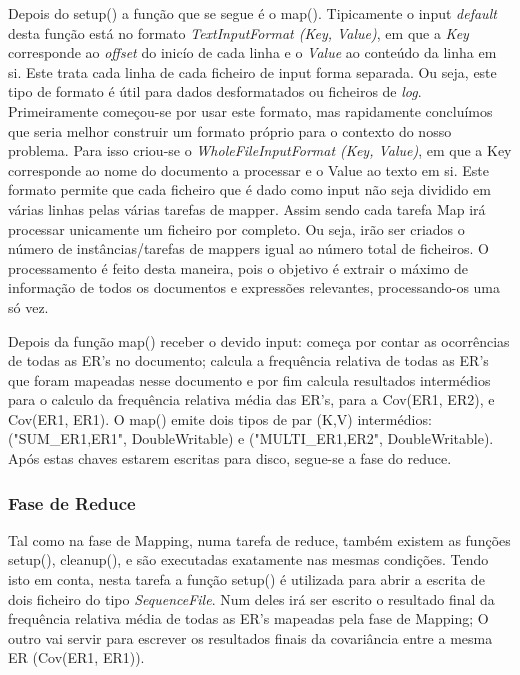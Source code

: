 Depois do setup() a função que se segue é o map(). Tipicamente o input \textit{default} desta função está no formato \textit{TextInputFormat (Key, Value)}, em que a \textit{Key} corresponde ao \textit{offset} do inicío de cada linha e o \textit{Value} ao conteúdo da linha em si. Este trata cada linha de cada ficheiro de input forma separada. Ou seja, este tipo de formato é útil para dados desformatados ou ficheiros de \textit{log}. Primeiramente começou-se por usar este formato, mas rapidamente concluímos que seria melhor construir um formato próprio para o contexto do nosso problema. Para isso criou-se o \textit{WholeFileInputFormat (Key, Value)}, em que a Key corresponde ao nome do documento a processar e o Value ao texto em si.
Este formato permite que cada ficheiro que é dado como input não seja dividido em várias linhas pelas várias tarefas de mapper. Assim sendo cada tarefa Map irá processar unicamente um ficheiro por completo. Ou seja, irão ser criados o número de instâncias/tarefas de mappers igual ao número total de ficheiros. O processamento é feito desta maneira, pois o objetivo é extrair o máximo de informação de todos os documentos e expressões relevantes, processando-os uma só vez.

Depois da função map() receber o devido input: começa por contar as ocorrências de todas as ER's no documento; calcula a frequência relativa de todas as ER's que foram mapeadas nesse documento e por fim calcula resultados intermédios para o calculo da frequência relativa média das ER's, para a Cov(ER1, ER2), e Cov(ER1, ER1). O map() emite dois tipos de par (K,V) intermédios: ("SUM\_ER1,ER1", DoubleWritable) e ("MULTI\_ER1,ER2", DoubleWritable). Após estas chaves estarem escritas para disco, segue-se a fase do reduce.

\subsubsection{Fase de Reduce}
Tal como na fase de Mapping, numa tarefa de reduce, também existem as funções setup(), cleanup(), e são executadas exatamente nas mesmas condições. Tendo isto em conta, nesta tarefa a função setup() é utilizada para abrir a escrita de dois ficheiro do tipo \textit{SequenceFile}. Num deles irá ser escrito o resultado final da frequência relativa média de todas as ER's mapeadas pela fase de Mapping; O outro vai servir para escrever os resultados finais da covariância entre a mesma ER (Cov(ER1, ER1)).

